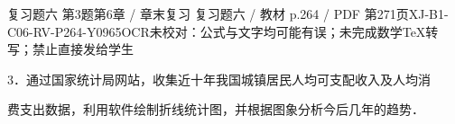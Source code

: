 \begin{bankitem}{复习题六 第3题}{第6章 / 章末复习 复习题六 / 教材 p.264 / PDF 第271页}{XJ-B1-C06-RV-P264-Y0965}{OCR未校对：公式与文字均可能有误；未完成数学TeX转写；禁止直接发给学生}
\begin{ocrdraft}
\par
3．通过国家统计局网站，收集近十年我国城镇居民人均可支配收入及人均消
\par
费支出数据，利用软件绘制折线统计图，并根据图象分析今后几年的趋势．
\end{ocrdraft}
\end{bankitem}
